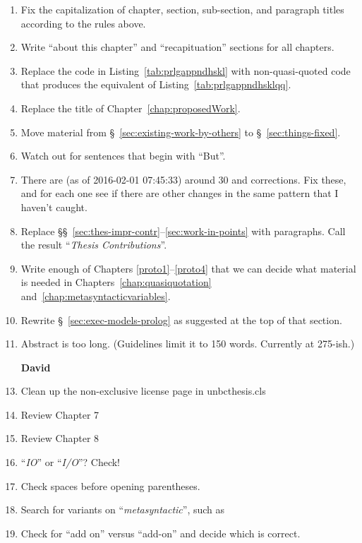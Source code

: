 \begin{scope}
\begin{enumerate}
\item
  Fix the capitalization of chapter,
  section, sub-section, and paragraph titles according to the rules above.

\item
  Write ``about this chapter'' and ``recapituation'' sections for all chapters.

\item
  Replace the  code in Listing~\vref{tab:prlgappndhskl} with non-quasi-quoted 
  code that produces the equivalent of Listing~\ref{tab:prlgappndhsklqq}.

\item
  Replace the title of Chapter~\vref{chap:proposedWork}.
  
\item
    Move material from \S~\ref{sec:existing-work-by-others} to \S~\ref{sec:things-fixed}. 

\item
  Watch out for sentences that begin with ``But''.

\item
  There are (as of 2016-02-01 07:45:33) around 30  and  corrections.  Fix these, and
  for each one see if there are other changes in the same pattern that I haven't caught.

\item
  Replace \S\S~\ref{sec:thes-impr-contr}--\ref{sec:work-in-points} with
  paragraphs.  Call the result ``\textsl{Thesis Contributions}''.

\item
  Write enough of Chapters \ref{proto1}--\ref{proto4} that we can decide
  what material is needed in Chapters~\ref{chap:quasiquotation}
  and~\ref{chap:metasyntacticvariables}.

\item
  Rewrite \S~\ref{sec:exec-models-prolog} as suggested at the top of that section. 

\item
  Abstract is too long.  (Guidelines limit it to 150 words.  Currently
  at 275-ish.)



\item [\textbf{David}]
\item Clean up the non-exclusive license page in unbcthesis.cls
\item Review Chapter 7
\item Review Chapter 8
\item ``\textit{IO}'' or ``\textit{I/O}''?  Check!
\item Check spaces before opening parentheses.
\item Search for variants on ``\textit{metasyntactic}'', such as
\item Check for ``add on'' versus ``add-on'' and decide which is correct.
\end{enumerate}


\end{scope}
